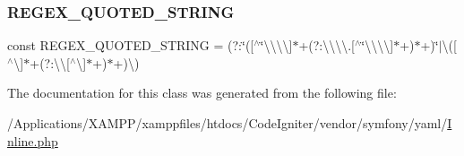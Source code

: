 \subsubsection{\texorpdfstring{R\+E\+G\+E\+X\+\_\+\+Q\+U\+O\+T\+E\+D\+\_\+\+S\+T\+R\+I\+NG}{REGEX\_QUOTED\_STRING}}
{\footnotesize\ttfamily const R\+E\+G\+E\+X\+\_\+\+Q\+U\+O\+T\+E\+D\+\_\+\+S\+T\+R\+I\+NG = \textquotesingle{}(?\+:\char`\"{}(\mbox{[}$^\wedge$\char`\"{}\textbackslash{}\textbackslash{}\textbackslash{}\textbackslash{}\mbox{]}$\ast$+(?\+:\textbackslash{}\textbackslash{}\textbackslash{}\textbackslash{}.\mbox{[}$^\wedge$\char`\"{}\textbackslash{}\textbackslash{}\textbackslash{}\textbackslash{}\mbox{]}$\ast$+)$\ast$+)\char`\"{}$\vert$\textbackslash{}\textquotesingle{}(\mbox{[}$^\wedge$\textbackslash{}\textquotesingle{}\mbox{]}$\ast$+(?\+:\textbackslash{}\textquotesingle{}\textbackslash{}\textquotesingle{}\mbox{[}$^\wedge$\textbackslash{}\textquotesingle{}\mbox{]}$\ast$+)$\ast$+)\textbackslash{}\textquotesingle{})\textquotesingle{}}



The documentation for this class was generated from the following file\+:\begin{DoxyCompactItemize}
\item 
/\+Applications/\+X\+A\+M\+P\+P/xamppfiles/htdocs/\+Code\+Igniter/vendor/symfony/yaml/\mbox{\hyperlink{_inline_8php}{Inline.\+php}}\end{DoxyCompactItemize}
